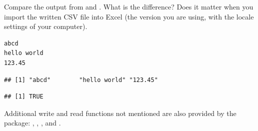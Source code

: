 \documentclass[krantz2,ChapterTOCs]{krantz}\usepackage{knitr}
\begin{document}
\begin{playground}
Compare the output from  and . What is the difference? Does it matter when you import the written CSV file into Excel (the version you are using, with the locale settings of your computer).
\end{playground}

\begin{knitrout}\footnotesize
{}\color{fgcolor}\begin{kframe}
\begin{alltt}
  \hlstd{=} \hlstd{)}
\hlstd{(}\hlstd{,}  \hlstd{=} \hlstd{)}
\end{alltt}
\end{kframe}
\end{knitrout}

\begin{knitrout}\footnotesize
{}\color{fgcolor}\begin{kframe}
\begin{verbatim}
abcd
hello world
123.45
\end{verbatim}
\end{kframe}
\end{knitrout}

\begin{knitrout}\footnotesize
{}\color{fgcolor}\begin{kframe}
\begin{alltt}
 \hlkwb{<-} \hlstd{(}\hlstd{)}
\end{alltt}
\begin{verbatim}
## [1] "abcd"        "hello world" "123.45"
\end{verbatim}
\begin{alltt}
  \hlstd{=} \hlstd{)}
\end{alltt}
\begin{verbatim}
## [1] TRUE
\end{verbatim}
\end{kframe}
\end{knitrout}

Additional write and read functions not mentioned are also provided by the package: , , , and .
\end{document}
